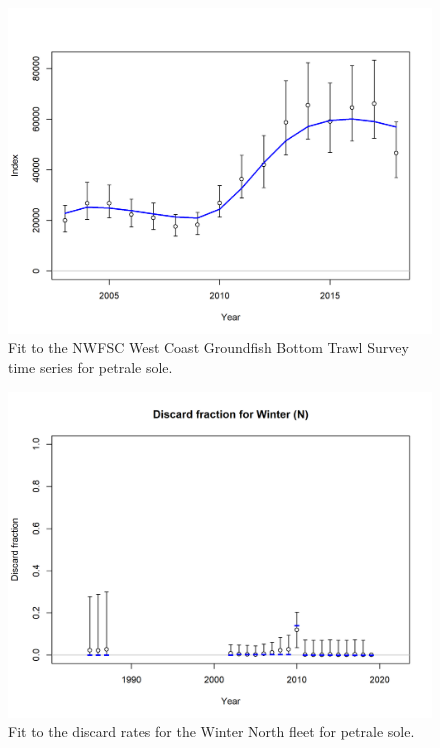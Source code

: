\documentclass[12pt,]{article}
\begin{document}
\FloatBarrier 

\begin{figure}
\centering
\includegraphics{r4ss/plots_mod1/index2_cpuefit_NWFSC West Coast Groundfish Bottom Trawl Survey.png}
\caption{Fit to the NWFSC West Coast Groundfish Bottom Trawl Survey time
series for petrale sole. \label{fig:fit_nwfsc_survey}}
\end{figure}

\FloatBarrier

\begin{figure}
\centering
\includegraphics{r4ss/plots_mod1/discard_dataWinter (N).png}
\caption{Fit to the discard rates for the Winter North fleet for petrale
sole. \label{fig:fit_wn_discard}}
\end{figure}
\end{document}
